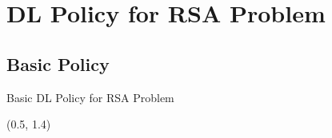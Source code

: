 \documentclass[english,aspectratio=169,dvipsnames]{beamer}
\begin{document}


%         



%         


\section{DL Policy for RSA Problem}

\subsection{Basic Policy}

\begin{frame}{Basic DL Policy for RSA Problem}
	\begin{textblock}{5}(0.5, 1.4)
        
    \end{textblock}
\end{frame}


\end{document}
